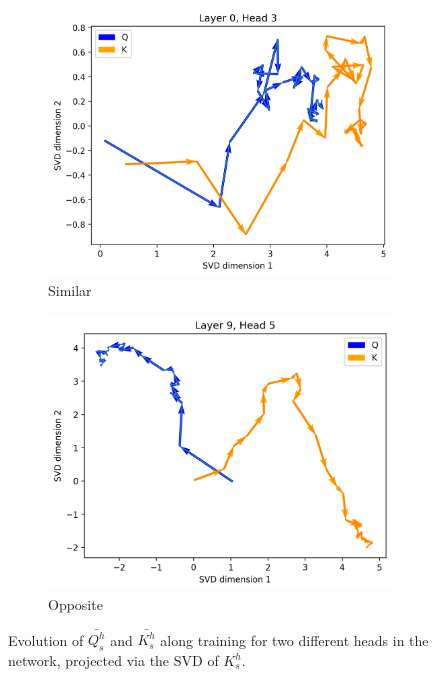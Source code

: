 \begin{appendices}
\begin{figure}[ht!]
    \centering
    \begin{subfigure}[b]{0.48\columnwidth}
         \includegraphics[width=\linewidth]{sources/part_1/anisotropy/imgs/l0h3_samedir_QK_K.png}
         \caption{Similar}
         \label{fig:QK_simdir_K}
    \end{subfigure}
    \begin{subfigure}[b]{0.48\columnwidth}
         \includegraphics[width=\linewidth]{sources/part_1/anisotropy/imgs/l9h5_diffdir_QK_K.png}
         \caption{Opposite}
         \label{fig:QK_diffdir_K}
    \end{subfigure}
    \caption{Evolution of $\bar{Q^h_s}$ and $\bar{K^h_s}$ along training for two different heads in the network, projected via the SVD of $K^h_s$.
    }
    \label{fig:QK_dir_K}
\end{figure}


\end{appendices}

